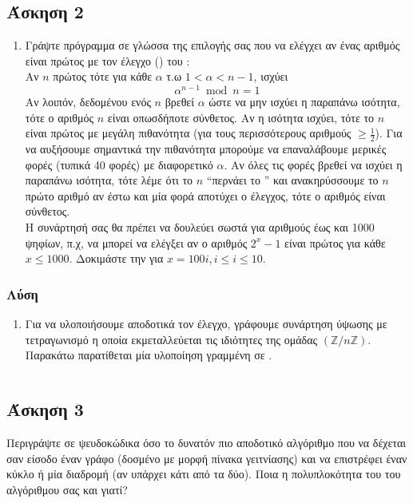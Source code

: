 \documentclass{assignment}
\begin{document}
\newpage\subsection*{Άσκηση 2}
\begin{enumerate}
\item
Γράψτε πρόγραμμα σε γλώσσα της επιλογής σας που να ελέγχει αν ένας αριθμός
είναι πρώτος με τον έλεγχο () του :\\
Αν $n$ πρώτος τότε για κάθε $\alpha$ τ.ω $1 < \alpha < n -1$, ισχύει
\begin{equation*} \alpha^{n-1} \bmod n = 1 \end{equation*}
Αν λοιπόν, δεδομένου ενός $n$ βρεθεί $\alpha$ ώστε να μην ισχύει η παραπάνω
ισότητα, τότε ο αριθμός $n$ είναι οπωσδήποτε σύνθετος. Αν η ισότητα ισχύει,
τότε το $n$ είναι πρώτος με μεγάλη πιθανότητα (για τους περισσότερους αριθμούς
$\ge \frac{1}{2}$). Για να αυξήσουμε σημαντικά την πιθανότητα μπορούμε να 
επαναλάβουμε μερικές φορές (τυπικά 40 φορές) με διαφορετικό $\alpha$. Αν όλες
τις φορές βρεθεί να ισχύει η παραπάνω ισότητα, τότε λέμε ότι το $n$ 
``περνάει το '' και ανακηρύσσουμε το $n$ πρώτο αριθμό αν
έστω και μία φορά αποτύχει ο έλεγχος, τότε ο αριθμός είναι σύνθετος.\\
Η συνάρτησή σας θα πρέπει να δουλεύει σωστά για αριθμούς έως και 1000 ψηφίων,
π.χ, να μπορεί να ελέγξει αν ο αριθμός $2^x-1$ είναι πρώτος για κάθε 
$x \le 1000$. Δοκιμάστε την για $x=100i, i \le i \le 10$. 
\end{enumerate}

\subsubsection*{Λύση}

\begin{enumerate}
\item
Για να υλοποιήσουμε αποδοτικά τον έλεγχο, γράφουμε συνάρτηση
ύψωσης με τετραγωνισμό η οποία εκμεταλλεύεται τις ιδιότητες της
ομάδας $(\mathbb{Z}/n\mathbb{Z})$. Παρακάτω παρατίθεται 
μία υλοποίηση γραμμένη σε .

\inputminted{haskell}{HaskellTemp.hs}

\end{enumerate}

\newpage\subsection*{Άσκηση 3}
Περιγράψτε σε ψευδοκώδικα όσο το δυνατόν πιο αποδοτικό αλγόριθμο που να δέχεται
σαν είσοδο έναν γράφο (δοσμένο με μορφή πίνακα γειτνίασης) και να επιστρέφει 
έναν κύκλο  ή μία διαδρομή  (αν υπάρχει κάτι από τα δύο).
Ποια η πολυπλοκότητα του του αλγόριθμου σας και γιατί?
\end{document}
